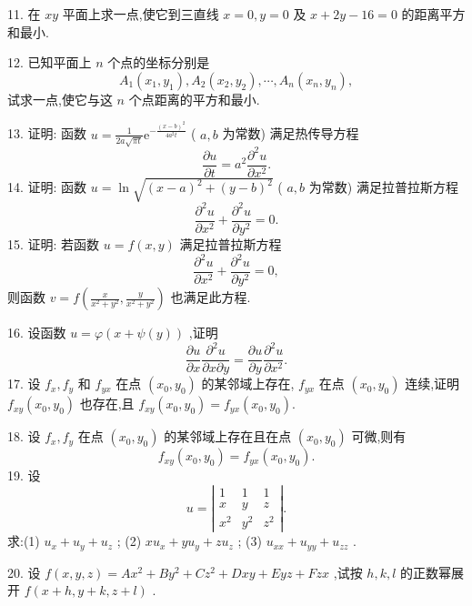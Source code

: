 \hspace*{4em} 11. 在 \({xy}\) 平面上求一点,使它到三直线 \(x = 0,y = 0\) 及 \(x + {2y} - {16} = 0\) 的距离平方和最小.

\hspace*{4em} 12. 已知平面上 \(n\) 个点的坐标分别是
\[
{A}_{1}\left( {{x}_{1},{y}_{1}}\right) ,{A}_{2}\left( {{x}_{2},{y}_{2}}\right) ,\cdots ,{A}_{n}\left( {{x}_{n},{y}_{n}}\right) ,
\]
试求一点,使它与这 \(n\) 个点距离的平方和最小.



13. 证明: 函数 \(u = \frac{1}{{2a}\sqrt{\pi t}}{\mathrm{e}}^{-\frac{{\left( x - b\right) }^{2}}{4{a}^{2}t}}\) ( \(a,b\) 为常数) 满足热传导方程
\[
\frac{\partial u}{\partial t} = {a}^{2}\frac{{\partial }^{2}u}{\partial {x}^{2}}.
\]
14. 证明: 函数 \(u = \ln \sqrt{{\left( x - a\right) }^{2} + {\left( y - b\right) }^{2}}\) ( \(a,b\) 为常数) 满足拉普拉斯方程
\[
\frac{{\partial }^{2}u}{\partial {x}^{2}} + \frac{{\partial }^{2}u}{\partial {y}^{2}} = 0.
\]
15. 证明: 若函数 \(u = f\left( {x,y}\right)\) 满足拉普拉斯方程
\[
\frac{{\partial }^{2}u}{\partial {x}^{2}} + \frac{{\partial }^{2}u}{\partial {y}^{2}} = 0,
\]
则函数 \(v = f\left( {\frac{x}{{x}^{2} + {y}^{2}},\frac{y}{{x}^{2} + {y}^{2}}}\right)\) 也满足此方程.

16. 设函数 \(u = \varphi \left( {x + \psi \left( y\right) }\right)\) ,证明
\[
\frac{\partial u}{\partial x}\frac{{\partial }^{2}u}{\partial x\partial y} = \frac{\partial u}{\partial y}\frac{{\partial }^{2}u}{\partial {x}^{2}}.
\]
17. 设 \({f}_{x},{f}_{y}\) 和 \({f}_{yx}\) 在点 \(\left( {{x}_{0},{y}_{0}}\right)\) 的某邻域上存在, \({f}_{yx}\) 在点 \(\left( {{x}_{0},{y}_{0}}\right)\) 连续,证明 \({f}_{xy}\left( {{x}_{0},{y}_{0}}\right)\) 也存在,且 \({f}_{xy}\left( {{x}_{0},{y}_{0}}\right)  = {f}_{yx}\left( {{x}_{0},{y}_{0}}\right) .\)

18. 设 \({f}_{x},{f}_{y}\) 在点 \(\left( {{x}_{0},{y}_{0}}\right)\) 的某邻域上存在且在点 \(\left( {{x}_{0},{y}_{0}}\right)\) 可微,则有
\[
{f}_{xy}\left( {{x}_{0},{y}_{0}}\right)  = {f}_{yx}\left( {{x}_{0},{y}_{0}}\right) .
\]
19. 设
\[
u = \left| \begin{matrix} 1 & 1 & 1 \\  x & y & z \\  {x}^{2} & {y}^{2} & {z}^{2} \end{matrix}\right| .
\]
求:(1) \({u}_{x} + {u}_{y} + {u}_{z}\) ; (2) \(x{u}_{x} + y{u}_{y} + z{u}_{z}\) ; (3) \({u}_{xx} + {u}_{yy} + {u}_{zz}\) .

20. 设 \(f\left( {x,y,z}\right)  = A{x}^{2} + B{y}^{2} + C{z}^{2} + {Dxy} + {Eyz} + {Fzx}\) ,试按 \(h,k,l\) 的正数幂展开 \(f\left( {x + h,y + k,z + l}\right)\) .

